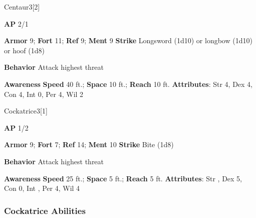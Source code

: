 \begin{monsection}{Centaur}{3}[2]
\vspace{-1em}\vspace{-1em}
\begin{spellcontent}
\begin{spelltargetinginfo}
{\textbf{AP} 2/1}

\pari \textbf{Armor} 9;
\textbf{Fort} 11;
\textbf{Ref} 9;
\textbf{Ment} 9
\pari \textbf{Strike} Longsword  (1d10) or longbow  (1d10) or hoof  (1d8)



\pari \textbf{Behavior} Attack highest threat
\end{spelltargetinginfo}
\end{spellcontent}

\begin{monsterfooter}
\pari \textbf{Awareness} 
\pari \textbf{Speed} 40 ft.;
\textbf{Space} 10 ft.;
\textbf{Reach} 10 ft.
\pari \textbf{Attributes}:
Str 4,
Dex 4,
Con 4,
Int 0,
Per 4,
Wil 2
\end{monsterfooter}
\end{monsection}

\begin{monsection}{Cockatrice}{3}[1]
\vspace{-1em}\vspace{-1em}
\begin{spellcontent}
\begin{spelltargetinginfo}
{\textbf{AP} 1/2}

\pari \textbf{Armor} 9;
\textbf{Fort} 7;
\textbf{Ref} 14;
\textbf{Ment} 10
\pari \textbf{Strike} Bite  (1d8)



\pari \textbf{Behavior} Attack highest threat
\end{spelltargetinginfo}
\end{spellcontent}

\begin{monsterfooter}
\pari \textbf{Awareness} 
\pari \textbf{Speed} 25 ft.;
\textbf{Space} 5 ft.;
\textbf{Reach} 5 ft.
\pari \textbf{Attributes}:
Str ,
Dex 5,
Con 0,
Int ,
Per 4,
Wil 4
\end{monsterfooter}
\end{monsection}


\subsubsection{Cockatrice Abilities}

